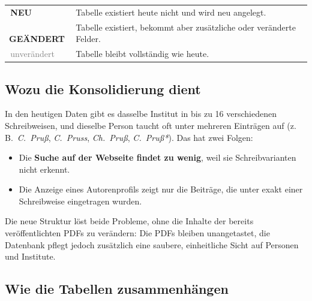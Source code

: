 \documentclass[11pt,a4paper,parskip=half-]{scrartcl}
\newcommand{\tagneu}{\colorbox{newtag!15}{\textcolor{newtag}{\sffamily\footnotesize\bfseries\,NEU\,}}}
\newcommand{\taggeandert}{\colorbox{changedtag!15}{\textcolor{changedtag}{\sffamily\footnotesize\bfseries\,GEÄNDERT\,}}}
\newcommand{\tagunv}{\textcolor{gray}{\sffamily\footnotesize\,unverändert\,}}
\begin{document}
\smallskip
\begin{tabular}{ll}
  \tagneu       & Tabelle existiert heute nicht und wird neu angelegt. \\
  \taggeandert  & Tabelle existiert, bekommt aber zusätzliche oder veränderte Felder. \\
  \tagunv       & Tabelle bleibt vollständig wie heute. \\
\end{tabular}

\subsection*{Wozu die Konsolidierung dient}

In den heutigen Daten gibt es dasselbe Institut in bis zu 16 verschiedenen
Schreibweisen, und dieselbe Person taucht oft unter mehreren Einträgen auf
(z.\,B.~\textit{C.~Pruß}, \textit{C.~Pruss}, \textit{Ch.~Pruß},
\textit{C.~Pruß*}). Das hat zwei Folgen:

\begin{itemize}\setlength{\itemsep}{2pt}
  \item Die \textbf{Suche auf der Webseite findet zu wenig}, weil sie
        Schreibvarianten nicht erkennt.
  \item Die Anzeige eines Autorenprofils zeigt nur die Beiträge, die
        unter exakt einer Schreibweise eingetragen wurden.
\end{itemize}

Die neue Struktur löst beide Probleme, ohne die Inhalte der bereits
veröffentlichten PDFs zu verändern: Die PDFs bleiben unangetastet,
die Datenbank pflegt jedoch zusätzlich eine saubere, einheitliche Sicht
auf Personen und Institute.

\subsection*{Wie die Tabellen zusammenhängen}
\end{document}
